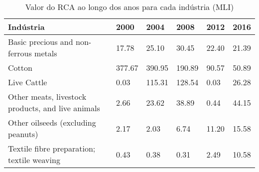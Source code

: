 \begin{table}
\centering
\caption{Valor do RCA ao longo dos anos para cada indústria (MLI)}
\begin{tabular}{p{6cm}p{1.5cm}p{1.5cm}p{1.5cm}p{1.5cm}p{1.5cm}}
\toprule
                                        Indústria &   2000 &   2004 &   2008 &  2012 &  2016 \\
\midrule
            Basic precious and non-ferrous metals &  17.78 &  25.10 &  30.45 & 22.40 & 21.39 \\
                                           Cotton & 377.67 & 390.95 & 190.89 & 90.57 & 50.89 \\
                                      Live Cattle &   0.03 & 115.31 & 128.54 &  0.03 & 26.28 \\
Other meats, livestock products, and live animals &   2.66 &  23.62 &  38.89 &  0.44 & 44.15 \\
               Other oilseeds (excluding peanuts) &   2.17 &   2.03 &   6.74 & 11.20 & 15.58 \\
       Textile fibre preparation; textile weaving &   0.43 &   0.38 &   0.31 &  2.49 & 10.58 \\
\bottomrule
\end{tabular}
\end{table}
